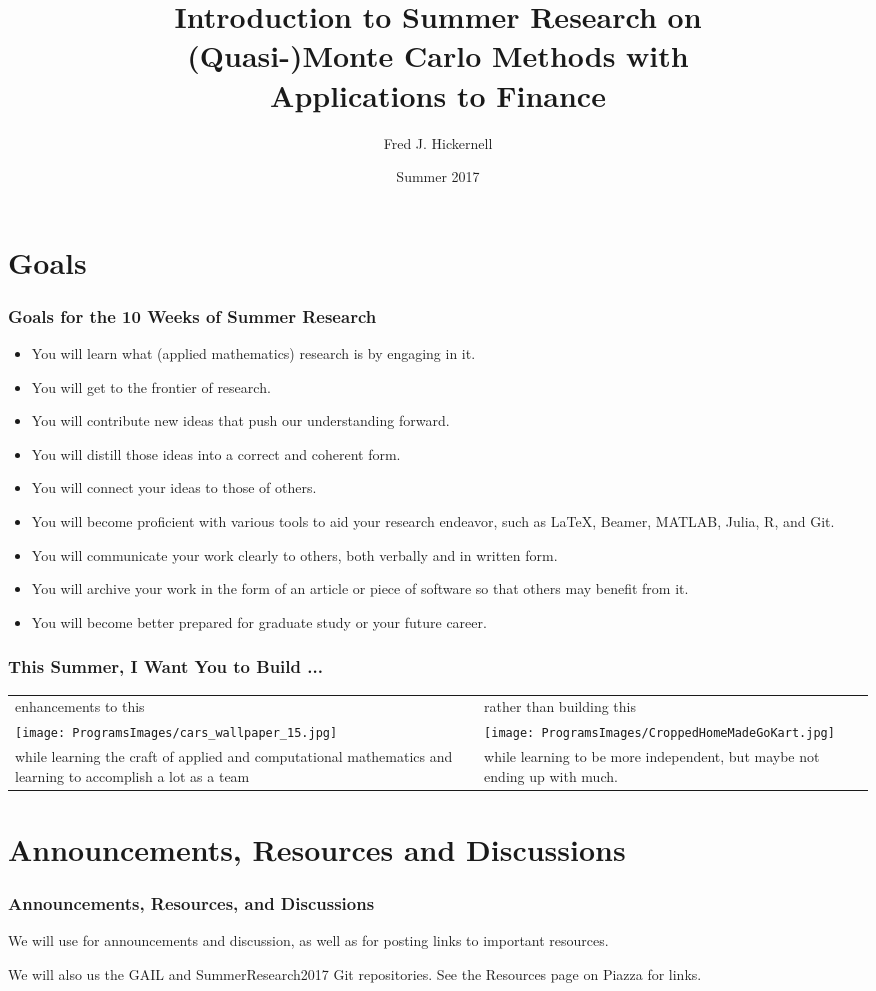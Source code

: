 \documentclass[10pt,compress,xcolor={usenames,dvipsnames},CJK]{beamer}
\title[(Quasi-)Monte Carlo \& Finance]{Introduction to Summer Research on \\
	(Quasi-)Monte Carlo Methods with \\[0.5ex] Applications to Finance}
\author{Fred J. Hickernell}
\institute{Department of Applied Mathematics,  Illinois Institute of Technology \\
\href{mailto:hickernell@iit.edu}{\nolinkurl{hickernell@iit.edu}} \quad
\href{http://mypages.iit.edu/~hickernell}{\nolinkurl{mypages.iit.edu/~hickernell}}}
\date{Summer 2017}
\begin{document}
\frame{\titlepage}

\section{Goals}
\begin{frame}\frametitle{Goals for the 10 Weeks of Summer Research}
\begin{itemize}
\item You will learn what (applied mathematics) research is by engaging in it.
\item You will get to the frontier of research.
\item You will contribute new ideas that push our understanding forward.
\item You will distill those ideas into a correct and coherent form.
\item You will connect your ideas to those of others.
\item You will become proficient with various tools to aid your research endeavor, such 
as \LaTeX, Beamer, MATLAB, Julia, R, and Git.
\item You will communicate your work clearly to others, both verbally and in written form.
\item You will archive your work in the form of an article or piece of software so that others may benefit from it.
\item You will become better prepared for graduate study or your future career.
\end{itemize}
\end{frame}

\begin{frame}
\frametitle{This Summer, I Want You to Build ...}
\begin{tabular}{>{\centering}m{5.5cm}>{\centering}m{5.5cm}}
enhancements to this &
rather than building this \tabularnewline
\texttt{[image: ProgramsImages/cars\_wallpaper\_15.jpg]} &
\texttt{[image: ProgramsImages/CroppedHomeMadeGoKart.jpg]} \tabularnewline
while learning the craft of applied and computational mathematics and learning to accomplish a lot as a team & while learning to be more independent, but maybe not ending up with much.
\end{tabular}
\end{frame}




\section{Announcements, Resources and Discussions}
\begin{frame}
\frametitle{Announcements, Resources, and Discussions}

We will use   for 
announcements and discussion, as well as for posting links to important resources.

We will also us the GAIL and SummerResearch2017 Git repositories.  See the Resources 
page on Piazza for links.

\end{frame}
\end{document}
